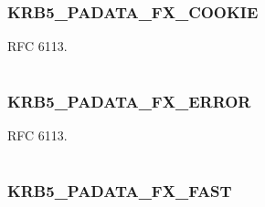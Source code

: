 \documentclass[letterpaper,10pt,english]{sphinxmanual}
\begin{document}
\subsubsection{KRB5\_PADATA\_FX\_COOKIE}
\label{appdev/refs/macros/KRB5_PADATA_FX_COOKIE:krb5-padata-fx-cookie}\label{appdev/refs/macros/KRB5_PADATA_FX_COOKIE::doc}\label{appdev/refs/macros/KRB5_PADATA_FX_COOKIE:krb5-padata-fx-cookie-data}

\begin{fulllineitems}
\label{appdev/refs/macros/KRB5_PADATA_FX_COOKIE:KRB5_PADATA_FX_COOKIE}
\end{fulllineitems}


RFC 6113.

\begin{tabulary}{\linewidth}{|L|L|}
\hline

 & 
\\\hline
\end{tabulary}



\subsubsection{KRB5\_PADATA\_FX\_ERROR}
\label{appdev/refs/macros/KRB5_PADATA_FX_ERROR:krb5-padata-fx-error}\label{appdev/refs/macros/KRB5_PADATA_FX_ERROR::doc}\label{appdev/refs/macros/KRB5_PADATA_FX_ERROR:krb5-padata-fx-error-data}

\begin{fulllineitems}
\label{appdev/refs/macros/KRB5_PADATA_FX_ERROR:KRB5_PADATA_FX_ERROR}
\end{fulllineitems}


RFC 6113.

\begin{tabulary}{\linewidth}{|L|L|}
\hline

 & 
\\\hline
\end{tabulary}



\subsubsection{KRB5\_PADATA\_FX\_FAST}
\label{appdev/refs/macros/KRB5_PADATA_FX_FAST::doc}\label{appdev/refs/macros/KRB5_PADATA_FX_FAST:krb5-padata-fx-fast}\label{appdev/refs/macros/KRB5_PADATA_FX_FAST:krb5-padata-fx-fast-data}
\end{document}
